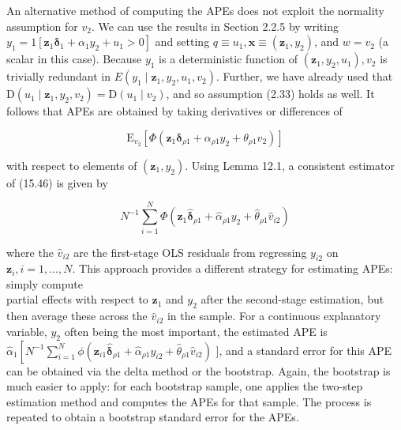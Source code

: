 \documentclass[10pt]{article}
\begin{document}
An alternative method of computing the APEs does not exploit the normality assumption for $v_{2}$. We can use the results in Section 2.2.5 by writing $y_{1}=1\left[\mathbf{z}_{1} \boldsymbol{\delta}_{1}+\right. \left.\alpha_{1} y_{2}+u_{1}>0\right]$ and setting $q \equiv u_{1}, \mathbf{x} \equiv\left(\mathbf{z}_{1}, y_{2}\right)$, and $w=v_{2}$ (a scalar in this case). Because $y_{1}$ is a deterministic function of $\left(\mathbf{z}_{1}, y_{2}, u_{1}\right), v_{2}$ is trivially redundant in $E\left(y_{1} \mid \mathbf{z}_{1}, y_{2}, u_{1}, v_{2}\right)$. Further, we have already used that $\mathrm{D}\left(u_{1} \mid \mathbf{z}_{1}, y_{2}, v_{2}\right)=\mathrm{D}\left(u_{1} \mid v_{2}\right)$, and so assumption (2.33) holds as well. It follows that APEs are obtained by taking derivatives or differences of


\begin{equation*}
\mathrm{E}_{v_{2}}\left[\Phi\left(\mathbf{z}_{1} \boldsymbol{\delta}_{\rho 1}+\alpha_{\rho 1} y_{2}+\theta_{\rho 1} v_{2}\right)\right] \tag{15.46}
\end{equation*}


with respect to elements of $\left(\mathbf{z}_{1}, y_{2}\right)$. Using Lemma 12.1, a consistent estimator of (15.46) is given by


\begin{equation*}
N^{-1} \sum_{i=1}^{N} \Phi\left(\mathbf{z}_{1} \hat{\boldsymbol{\delta}}_{\rho 1}+\hat{\alpha}_{\rho 1} y_{2}+\hat{\theta}_{\rho 1} \hat{v}_{i 2}\right) \tag{15.47}
\end{equation*}


where the $\hat{v}_{i 2}$ are the first-stage OLS residuals from regressing $y_{i 2}$ on $\mathbf{z}_{i}, i=1, \ldots, N$. This approach provides a different strategy for estimating APEs: simply compute\\
partial effects with respect to $\mathbf{z}_{1}$ and $y_{2}$ after the second-stage estimation, but then average these across the $\hat{v}_{i 2}$ in the sample. For a continuous explanatory variable, $y_{2}$ often being the most important, the estimated APE is $\hat{\alpha}_{1}\left[N^{-1} \sum_{i=1}^{N} \phi\left(\mathbf{z}_{i 1} \hat{\boldsymbol{\delta}}_{\rho 1}+\hat{\alpha}_{\rho 1} y_{i 2}+\right.\right. \left.\hat{\theta}_{\rho 1} \hat{v}_{i 2}\right)$ ], and a standard error for this APE can be obtained via the delta method or the bootstrap. Again, the bootstrap is much easier to apply: for each bootstrap sample, one applies the two-step estimation method and computes the APEs for that sample. The process is repeated to obtain a bootstrap standard error for the APEs.
\end{document}
